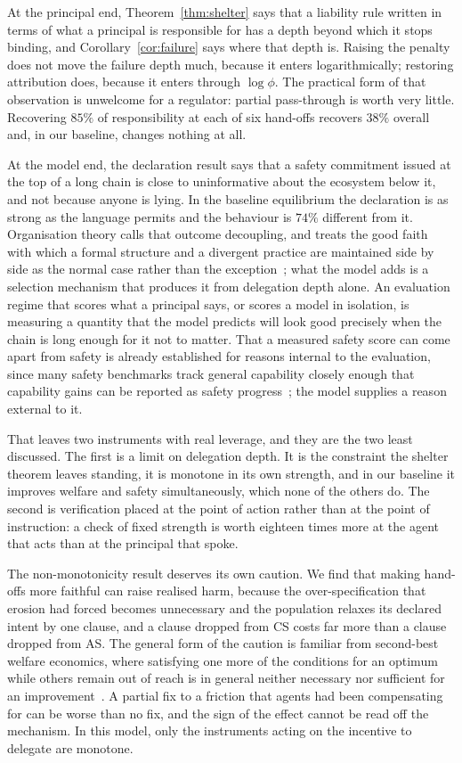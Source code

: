 \documentclass[11pt,a4paper]{article}
\theoremstyle{definition}
\newcommand{\AS}{\textsf{AS}}
\newcommand{\CS}{\textsf{CS}}
\begin{document}
At the principal end, Theorem~\ref{thm:shelter} says that a liability rule
written in terms of what a principal is responsible for has a depth beyond
which it stops binding, and Corollary~\ref{cor:failure} says where that depth
is. Raising the penalty does not move the failure depth much, because it enters
logarithmically; restoring attribution does, because it enters through
$\log\phi$. The practical form of that observation is unwelcome for a
regulator: partial pass-through is worth very little. Recovering $85\%$ of
responsibility at each of six hand-offs recovers $38\%$ overall and, in our
baseline, changes nothing at all.

At the model end, the declaration result says that a safety commitment issued at
the top of a long chain is close to uninformative about the ecosystem below it,
and not because anyone is lying. In the baseline equilibrium the declaration is
as strong as the language permits and the behaviour is $74\%$ different from it.
Organisation theory calls that outcome decoupling, and treats the good faith
with which a formal structure and a divergent practice are maintained side by
side as the normal case rather than the exception~\citep{meyer1977myth}; what
the model adds is a selection mechanism that produces it from delegation depth
alone.
An evaluation regime that scores what a principal says, or scores a model in
isolation, is measuring a quantity that the model predicts will look good
precisely when the chain is long enough for it not to matter. That a measured
safety score can come apart from safety is already established for reasons
internal to the evaluation, since many safety benchmarks track general
capability closely enough that capability gains can be reported as safety
progress~\citep{ren2024safetywashing}; the model supplies a reason external to
it.

That leaves two instruments with real leverage, and they are the two least
discussed. The first is a limit on delegation depth. It is the constraint the
shelter theorem leaves standing, it is monotone in its own strength, and in our
baseline it improves welfare and safety simultaneously, which none of the
others do. The second is verification placed at the point of action rather than
at the point of instruction: a check of fixed strength is worth eighteen times
more at the agent that acts than at the principal that spoke.

The non-monotonicity result deserves its own caution. We find that making
hand-offs more faithful can raise realised harm, because the over-specification
that erosion had forced becomes unnecessary and the population relaxes its
declared intent by one clause, and a clause dropped from \CS{} costs far more
than a clause dropped from \AS{}. The general form of the caution is familiar
from second-best welfare economics, where satisfying one more of the conditions
for an optimum while others remain out of reach is in general neither necessary
nor sufficient for an improvement~\citep{lipsey1956secondbest}. A partial fix
to a friction that agents had been compensating for can be worse than no fix,
and the sign of the effect cannot be read off the mechanism. In this model, only the instruments acting on
the incentive to delegate are monotone.
\end{document}
